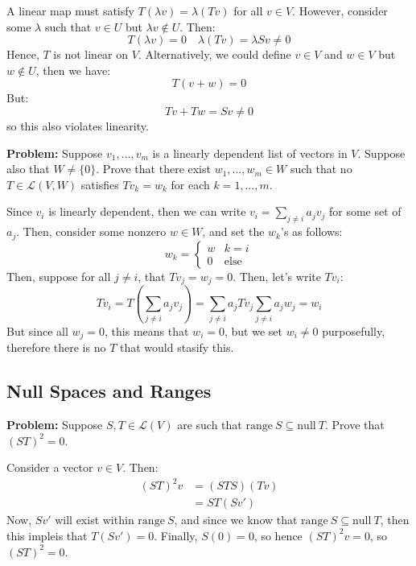 \documentclass[10pt]{article}
\newcommand{\range}{\mathrm{range \ }}
\renewcommand{\null}{\mathrm{null \ }}
\newenvironment{problem}{\textbf{Problem:}}{}
\begin{document}
	\begin{solution}
		A linear map must satisfy \( T(\lambda v) = \lambda (Tv) \)  for all \( v \in V \). However, consider 
		some \( \lambda \) such that \( v \in U \) but \(\lambda v \not\in U \). Then:
		\[
		T(\lambda v) = 0 \quad \lambda (Tv) = \lambda Sv \neq 0 
		\] 
		Hence, \( T \) is not linear on \( V \). Alternatively, we could define \( v \in V \) and \( w \in V \) 
		but \( w \not \in U \), then we have:
		\[
		T(v + w) = 0
		\] 
		But:
		\[
		Tv + Tw = Sv \neq 0
		\] 
		so this also violates linearity.  
	\end{solution}

	\begin{problem}
		Suppose \( v_1, \dots, v_m \) is a linearly dependent list of vectors in \( V \). Suppose also that \( W \neq 
		\{0\} \). Prove that there exist \( w_1, \dots, w_m \in W \) such that no \( T \in \mathcal L(V, W) \) 
		satisfies \( Tv_k = w_k \) for each \( k = 1, \dots, m \). 
	\end{problem}

	\begin{solution}
		Since \( v_i \) is linearly dependent, then we can write \( v_i = \sum_{j \neq i} a_j v_j \) for some 
		set of \( a_j \). Then, consider some nonzero  \( w \in W \), and set the \( w_k \)'s as follows:
		\[
		w_k = \begin{cases}
			w & k = i\\
			0& \text{else}
		\end{cases}
		\] 
		Then, suppose for all \( j \neq i \), that \( Tv_j = w_j = 0\). Then, let's write \( Tv_i \):
		\[
			Tv_i = T\left( \sum_{j \neq i}a_j v_j \right) = \sum_{j \neq i}a_j Tv_j \sum_{j \neq i}a_j w_j = w_i
		\] 
		But since all \( w_j = 0 \), this means that \( w_i = 0 \), but we set \( w_i \neq 0 \) purposefully, 
		therefore there is no \( T \) that would stasify this. 
	\end{solution}
	\subsection{Null Spaces and Ranges}
	\begin{problem}
		Suppose \( S, T \in \mathcal L(V) \) are such that \( \range S \subseteq \null T\). Prove that \( (ST)^2 = 0 \).
	\end{problem}

	\begin{solution}
		Consider a vector \( v \in V \). Then:
		 \begin{align*}
			 (ST)^2 v &= (STS)(Tv) \\
			 &= ST(Sv') 
		\end{align*}
		Now, \( Sv' \) will exist within \( \range S \), and since we know that \( \range S \subseteq \null T \), 
		then this impleis that \( T(Sv') = 0 \). Finally, \( S(0) = 0 \), so hence \( (ST)^2 v = 0 \), so 
		\( (ST)^2 = 0 \). 
	\end{solution}
\end{document}
